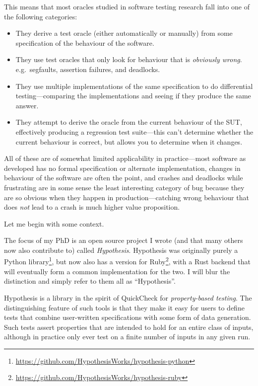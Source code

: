 This means that most oracles studied in software testing research fall into one of the following categories:

\begin{itemize}
\item They derive a test oracle (either automatically or manually) from some specification of the behaviour of the software.
\item They use test oracles that only look for behaviour that is \emph{obviously wrong}.
e.g.\ segfaults, assertion failures, and deadlocks.
\item They use multiple implementations of the same specification to do differential testing---comparing
the implementations and seeing if they produce the same answer.
\item They attempt to derive the oracle from the current behaviour of the SUT,
effectively producing a regression test suite---this
can't determine whether the current behaviour is correct,
but allows you to determine when it changes.
\end{itemize}

All of these are of somewhat limited applicability in practice---most
software as developed has no formal specification or alternate implementation,
changes in behaviour of the software are often the point,
and crashes and deadlocks while frustrating are in some sense the least interesting category of bug because they are so obvious when they happen in production---catching
wrong behaviour that does \emph{not} lead to a crash is much higher value proposition.

Let me begin with some context.

The focus of my PhD is an open source project I wrote (and that many others now also contribute to) called \emph{Hypothesis}.
Hypothesis was originally purely a Python library\footnote{\url{https://github.com/HypothesisWorks/hypothesis-python}},
but now also has a version for Ruby\footnote{\url{https://github.com/HypothesisWorks/hypothesis-ruby}},
with a Rust backend that will eventually form a common implementation for the two.
I will blur the distinction and simply refer to them all as ``Hypothesis''.

Hypothesis is a library in the spirit of QuickCheck\cite{DBLP:conf/icfp/ClaessenH00} for \emph{property-based testing}.
The distinguishing feature of such tools is that they make it easy for users to define tests that combine user-written specifications with some form of data generation.
Such tests assert properties that are intended to hold for an entire class of inputs,
although in practice only ever test on a finite number of inputs in any given run.

